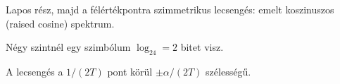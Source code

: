 Lapos rész, majd a félértékpontra szimmetrikus lecsengés: emelt koszinuszos (raised cosine) spektrum.

Négy szintnél egy szimbólum $\log_24=2$ bitet visz.

\begin{center}\end{center}

A lecsengés a $1/(2T)$ pont körül $\pm\alpha/(2T)$ szélességű.

\begin{center}\end{center}

\begin{center}\end{center}


